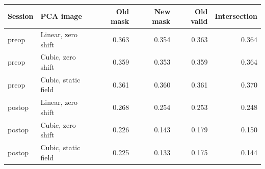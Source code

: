 \begin{tabular}{llrrrr}
\toprule
Session & PCA image & Old mask & New mask & Old valid & Intersection \\
\midrule
preop & Linear, zero shift & 0.363 & 0.354 & 0.363 & 0.364 \\
preop & Cubic, zero shift & 0.359 & 0.353 & 0.359 & 0.364 \\
preop & Cubic, static field & 0.361 & 0.360 & 0.361 & 0.370 \\
postop & Linear, zero shift & 0.268 & 0.254 & 0.253 & 0.248 \\
postop & Cubic, zero shift & 0.226 & 0.143 & 0.179 & 0.150 \\
postop & Cubic, static field & 0.225 & 0.133 & 0.175 & 0.144 \\
\bottomrule
\end{tabular}
